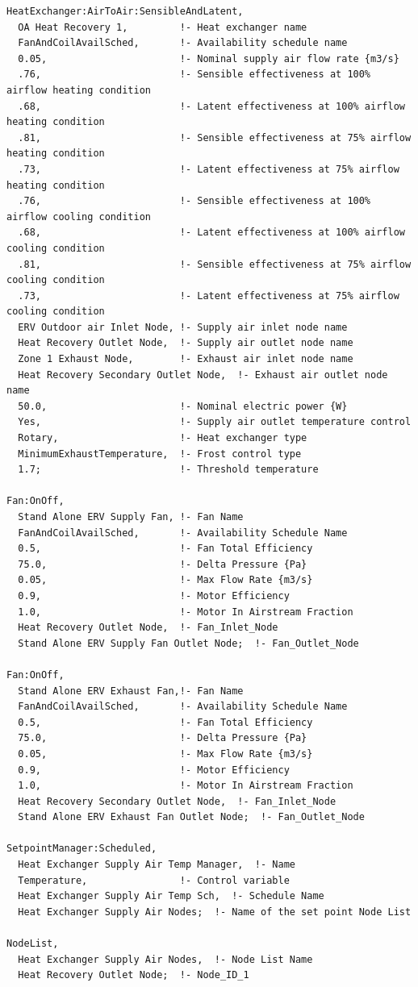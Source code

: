 \begin{lstlisting}
HeatExchanger:AirToAir:SensibleAndLatent,
  OA Heat Recovery 1,         !- Heat exchanger name
  FanAndCoilAvailSched,       !- Availability schedule name
  0.05,                       !- Nominal supply air flow rate {m3/s}
  .76,                        !- Sensible effectiveness at 100% airflow heating condition
  .68,                        !- Latent effectiveness at 100% airflow heating condition
  .81,                        !- Sensible effectiveness at 75% airflow heating condition
  .73,                        !- Latent effectiveness at 75% airflow heating condition
  .76,                        !- Sensible effectiveness at 100% airflow cooling condition
  .68,                        !- Latent effectiveness at 100% airflow cooling condition
  .81,                        !- Sensible effectiveness at 75% airflow cooling condition
  .73,                        !- Latent effectiveness at 75% airflow cooling condition
  ERV Outdoor air Inlet Node, !- Supply air inlet node name
  Heat Recovery Outlet Node,  !- Supply air outlet node name
  Zone 1 Exhaust Node,        !- Exhaust air inlet node name
  Heat Recovery Secondary Outlet Node,  !- Exhaust air outlet node name
  50.0,                       !- Nominal electric power {W}
  Yes,                        !- Supply air outlet temperature control
  Rotary,                     !- Heat exchanger type
  MinimumExhaustTemperature,  !- Frost control type
  1.7;                        !- Threshold temperature

Fan:OnOff,
  Stand Alone ERV Supply Fan, !- Fan Name
  FanAndCoilAvailSched,       !- Availability Schedule Name
  0.5,                        !- Fan Total Efficiency
  75.0,                       !- Delta Pressure {Pa}
  0.05,                       !- Max Flow Rate {m3/s}
  0.9,                        !- Motor Efficiency
  1.0,                        !- Motor In Airstream Fraction
  Heat Recovery Outlet Node,  !- Fan_Inlet_Node
  Stand Alone ERV Supply Fan Outlet Node;  !- Fan_Outlet_Node

Fan:OnOff,
  Stand Alone ERV Exhaust Fan,!- Fan Name
  FanAndCoilAvailSched,       !- Availability Schedule Name
  0.5,                        !- Fan Total Efficiency
  75.0,                       !- Delta Pressure {Pa}
  0.05,                       !- Max Flow Rate {m3/s}
  0.9,                        !- Motor Efficiency
  1.0,                        !- Motor In Airstream Fraction
  Heat Recovery Secondary Outlet Node,  !- Fan_Inlet_Node
  Stand Alone ERV Exhaust Fan Outlet Node;  !- Fan_Outlet_Node

SetpointManager:Scheduled,
  Heat Exchanger Supply Air Temp Manager,  !- Name
  Temperature,                !- Control variable
  Heat Exchanger Supply Air Temp Sch,  !- Schedule Name
  Heat Exchanger Supply Air Nodes;  !- Name of the set point Node List

NodeList,
  Heat Exchanger Supply Air Nodes,  !- Node List Name
  Heat Recovery Outlet Node;  !- Node_ID_1
\end{lstlisting}

